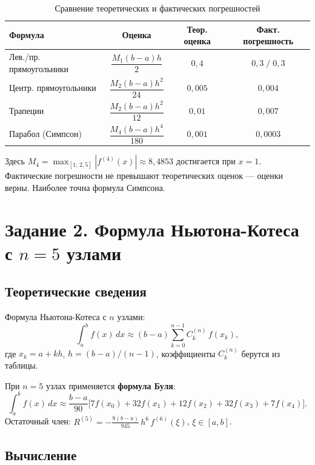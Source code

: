 \documentclass[a4paper, final]{article}
\begin{document}
\begin{table}[h!]
\centering
\caption{Сравнение теоретических и фактических погрешностей}
\label{tab:s1_err}
\renewcommand{\arraystretch}{1.4}
\small
\begin{tabular}{|l|c|c|c|}
\hline
Формула & Оценка & Теор. оценка & Факт. погрешность \\
\hline
Лев./пр. прямоугольники
  & $\dfrac{M_1(b-a)h}{2}$
  & $0{,}4$
  & $0{,}3\;/\;0{,}3$ \\[8pt]
\hline
Центр. прямоугольники
  & $\dfrac{M_2(b-a)h^2}{24}$
  & $0{,}005$
  & $0{,}004$ \\[8pt]
\hline
Трапеции
  & $\dfrac{M_2(b-a)h^2}{12}$
  & $0{,}01$
  & $0{,}007$ \\[8pt]
\hline
Парабол (Симпсон)
  & $\dfrac{M_4(b-a)h^4}{180}$
  & $0{,}001$
  & $0{,}0003$ \\[8pt]
\hline
\end{tabular}
\end{table}
Здесь $M_4 = \max_{[1;\,2{,}5]}|f^{(4)}(x)| \approx 8{,}4853$ достигается при $x=1$.
Фактические погрешности не превышают теоретических оценок --- оценки верны.
Наиболее точна формула Симпсона.

\newpage

\section{Задание 2. Формула Ньютона-Котеса с $n = 5$ узлами}

\subsection{Теоретические сведения}

Формула Ньютона-Котеса с $n$ узлами:
\[
\int_a^b f(x)\,dx \approx (b-a)\sum_{k=0}^{n-1} C_k^{(n)}\,f(x_k),
\]
где $x_k = a + kh$, $h = (b-a)/(n-1)$, коэффициенты $C_k^{(n)}$ берутся из таблицы.

При $n = 5$ узлах применяется \textbf{формула Буля}:
\[
\int_a^b f(x)\,dx \approx \frac{b-a}{90}\bigl[7f(x_0)+32f(x_1)+12f(x_2)+32f(x_3)+7f(x_4)\bigr].
\]
Остаточный член: $\displaystyle R^{(5)} = -\frac{8(b-a)}{945}\,h^6\,f^{(6)}(\xi)$,
$\xi\in[a,b]$.

\subsection{Вычисление}
\end{document}
